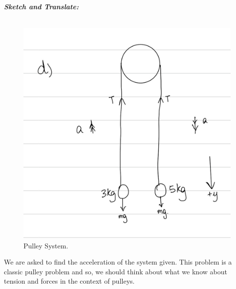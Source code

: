 \begin{subquestions}
\textbf{\textit{Sketch and Translate:}} \\ \\
\begin{figure}[H]
	\begin{center}
		\includegraphics[scale=0.25]{../2015/figures/2015q6-4}
		\caption{\label{2015:q6:fig:Sketch4} Pulley System.}
	\end{center}
\end{figure}	
We are asked to find the acceleration of the system given. This problem is a classic pulley problem and so, we should think about what we know about tension and forces in the context of pulleys.





\end{subquestions}
